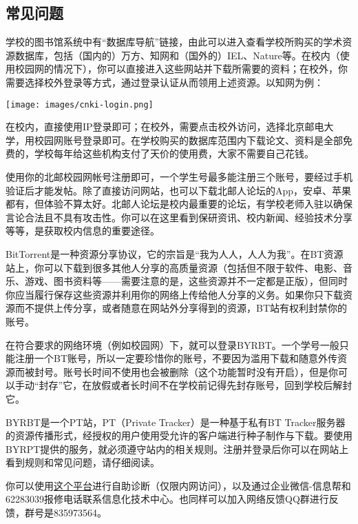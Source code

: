 \subsection*{常见问题}


学校的图书馆系统中有“数据库导航”链接，由此可以进入查看学校所购买的学术资源数据库，包括（国内的）万方、知网和（国外的）IEL、Nature等。在校内（使用校园网的情况下），你可以直接进入这些网站并下载所需要的资料；在校外，你需要选择校外登录等方式，通过登录认证从而领用上述资源。以知网为例：

\begin{center}
    \texttt{[image: images/cnki-login.png]}
\end{center}

在校内，直接使用IP登录即可；在校外，需要点击校外访问，选择北京邮电大学，用校园网账号登录即可。在学校购买的数据库范围内下载论文、资料是全部免费的，学校每年给这些机构支付了天价的使用费，大家不需要自己花钱。


使用你的北邮校园网帐号注册即可，一个学生号最多能注册三个账号，要经过手机验证后才能发帖。除了直接访问网站，也可以下载北邮人论坛的App，安卓、苹果都有，但体验不算太好。北邮人论坛是校内最重要的论坛，有学校老师入驻以确保言论合法且不具有攻击性。你可以在这里看到保研资讯、校内新闻、经验技术分享等等，是获取校内信息的重要途径。


BitTorrent是一种资源分享协议，它的宗旨是“我为人人，人人为我”。在BT资源站上，你可以下载到很多其他人分享的高质量资源（包括但不限于软件、电影、音乐、游戏、图书资料等——需要注意的是，这些资源并不一定都是正版），但同时你应当履行保存这些资源并利用你的网络上传给他人分享的义务。如果你只下载资源而不提供上传分享，或者随意在网站外分享得到的资源，BT站有权利封禁你的账号。

在符合要求的网络环境（例如校园网）下，就可以登录BYRBT。一个学号一般只能注册一个BT账号，所以一定要珍惜你的账号，不要因为滥用下载和随意外传资源而被封号。账号长时间不使用也会被删除（这个功能暂时没有开启），但是你可以手动“封存”它，在放假或者长时间不在学校前记得先封存账号，回到学校后解封它。

BYRBT是一个PT站，PT（Private Tracker）是一种基于私有BT Tracker服务器的资源传播形式，经授权的用户使用受允许的客户端进行种子制作与下载。要使用BYRPT提供的服务，就必须遵守站内的相关规则。注册并登录后你可以在网站上看到规则和常见问题，请仔细阅读。


你可以使用\href{https://buptnet.icu}{这个平台}进行自助诊断（仅限内网访问），以及通过企业微信-信息帮和62283039报修电话联系信息化技术中心。也同样可以加入网络反馈QQ群进行反馈，群号是835973564。
